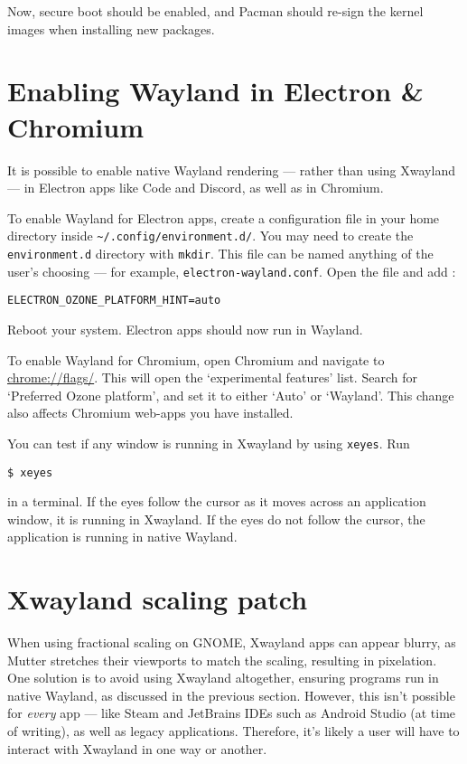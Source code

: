 \documentclass[a4paper]{article}
\begin{document}
Now, secure boot should be enabled, and Pacman should re-sign the kernel images when installing new packages.

\section{Enabling Wayland in Electron \& Chromium}

It is possible to enable native Wayland rendering --- rather than using Xwayland --- in Electron apps like Code and Discord, as well as in Chromium.

To enable Wayland for Electron apps, create a configuration file in your home directory inside \lstinline|~/.config/environment.d/|.
You may need to create the \lstinline|environment.d| directory with \lstinline|mkdir|.
This file can be named anything of the user's choosing --- for example, \lstinline|electron-wayland.conf|.
Open the file and add \cite{arch-wiki-wayland}:
\begin{lstlisting}
ELECTRON_OZONE_PLATFORM_HINT=auto
\end{lstlisting}
Reboot your system.
Electron apps should now run in Wayland.

To enable Wayland for Chromium, open Chromium and navigate to \url{chrome://flags/}.
This will open the `experimental features' list.
Search for `Preferred Ozone platform', and set it to either `Auto' or `Wayland'.
This change also affects Chromium web-apps you have installed.

You can test if any window is running in Xwayland by using \lstinline|xeyes|.
Run
\begin{lstlisting}
$ xeyes
\end{lstlisting}
in a terminal.
If the eyes follow the cursor as it moves across an application window, it is running in Xwayland.
If the eyes do not follow the cursor, the application is running in native Wayland.

\section{Xwayland scaling patch}

When using fractional scaling on GNOME, Xwayland apps can appear blurry, as Mutter stretches their viewports to match the scaling, resulting in pixelation.
One solution is to avoid using Xwayland altogether, ensuring programs run in native Wayland, as discussed in the previous section.
However, this isn't possible for \emph{every} app --- like Steam and JetBrains IDEs such as Android Studio (at time of writing), as well as legacy applications.
Therefore, it's likely a user will have to interact with Xwayland in one way or another.
\end{document}
